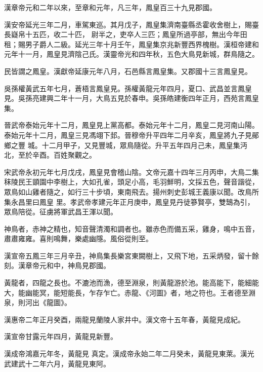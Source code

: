 \begin{pinyinscope}
 漢章帝元和二年以來，至章和元年，凡三年，鳳皇百三十九見郡國。



 漢安帝延光三年二月，車駕東巡。其月戊子，鳳皇集濟南臺縣丞霍收舍樹上，賜臺長嶷帛十五匹，收二十匹，
 尉半之，吏卒人三匹；鳳皇所過亭部，無出今年田租；賜男子爵人二級。延光三年十月壬午，鳳皇集京兆新豐西界槐樹。漢桓帝建和元年十一月，鳳皇見濟陰己氏。漢靈帝光和四年秋，五色大鳥見新城，群鳥隨之。



 民皆謂之鳳皇。漢獻帝延康元年八月，石邑縣言鳳皇集。又郡國十三言鳳皇見。



 吳孫權黃武五年七月，蒼梧言鳳皇見。孫權黃龍元年四月，夏口、武昌並言鳳皇見。吳孫亮建興二年十一月，大鳥五見於春申。吳孫皓建衡四年正月，西苑言鳳皇集。



 晉武帝泰始元年十二月，鳳皇見上黨高都。泰始元年十二月，鳳皇二見河南山陽。泰始元年十二月，鳳皇三見馮翊下邽。晉穆帝升平四年二月辛亥，鳳皇將九子見鄖鄉之豐
 城。十二月甲子，又見豐城，眾鳥隨從。升平五年四月己未，鳳皇集沔北，至於辛酉。百姓聚觀之。



 宋武帝永初元年七月戊戌，鳳皇見會稽山陰。文帝元嘉十四年三月丙申，大鳥二集秣陵民王顗園中李樹上，大如孔雀，頭足小高，毛羽鮮明，文採五色，聲音諧從，眾鳥如山雞者隨之，如行三十步頃，東南飛去。揚州刺史彭城王義康以聞。改鳥所集永昌里曰鳳皇
 里。孝武帝孝建元年正月庚申，鳳皇見丹徒篸賢亭，雙鵠為引，眾鳥陪從。征虜將軍武昌王渾以聞。



 神鳥者，赤神之精也，知音聲清濁和調者也。雖赤色而備五采，雞身，鳴中五音，肅肅雍雍。喜則鳴舞，樂處幽隱。風俗從則至。



 漢宣帝五鳳三年三月辛丑，神鳥集長樂宮東闕樹上，又飛下地，五采炳發，留十餘刻。漢章帝元和中，神鳥見郡國。



 黃龍者，四龍之長也。不漉池而漁，德至淵泉，則黃龍游於池。能高能下，能細能大，能幽能冥，能短能長，乍存乍亡。赤龍、《河圖》者，地之符也。王者德至淵泉，則河出《龍圖》。



 漢惠帝二年正月癸酉，兩龍見蘭陵人家井中。漢文帝十五年春，黃龍見成紀。



 漢宣帝甘露元年四月，黃龍見新豐。



 漢成帝鴻嘉元年冬，黃龍見
 真定。漢成帝永始二年二月癸未，黃龍見東萊。漢光武建武十二年六月，黃龍見東阿。




\end{pinyinscope}
